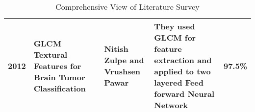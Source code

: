\begin{table}[h!]
\begin{tabular}{|l|p{3cm}|p{3cm}|p{3cm}|p{3cm}|}
  \hline
 
  
  
  2012  & GLCM Textural Features for Brain Tumor Classification & Nitish Zulpe and Vrushsen Pawar & They used GLCM for feature extraction and applied to two layered Feed forward Neural Network   &   97.5\% \\
  
  \hline
  
  
   \end{tabular}
    \caption{Comprehensive View of Literature Survey}
    \label{tab:my_label}
 \end{table}